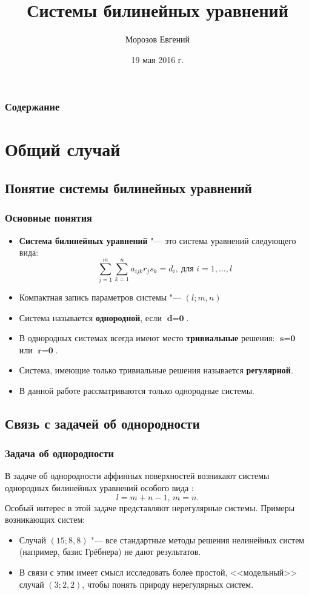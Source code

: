 \documentclass[russian,hyperref={unicode}]{beamer}
\title{Системы билинейных уравнений}
\institute
{
	Воронежский Государственный Университет \\
	Факультет Компьютерных Наук
}
\author{Морозов Евгений}
\date{19 мая 2016 г.}
\begin{document}
\frame{\titlepage}

\section[Содержание]{}
\frame
{
	\frametitle{Содержание}
	\tableofcontents
}

\section{Общий случай}
\subsection{Понятие системы билинейных уравнений}
\frame
{
  \frametitle{Основные понятия}
  
	\begin{itemize}
		\item \textbf{Система билинейных уравнений} "--- это система уравнений следующего вида:
		$$
			\sum_{j = 1}^{m} \sum_{k = 1}^{n} a_{i j k} r_j s_k = d_i,~\text{для } i = 
			1,\dots,l
		$$
		\item Компактная запись параметров системы "--- $(l; m, n)$
		\item Система называется \textbf{однородной}, если $\textbf{d} = \textbf{0}$. 
	 	\item В однородных 	системах всегда имеют место \textbf{тривиальные} решения: $\textbf{s} =  
			  \textbf{0}$ или $\textbf{r} = \textbf{0}$.
		\item Система, имеющие только тривиальные решения называется \textbf{регулярной}.
		\item В данной работе рассматриваются только однородные системы.
	\end{itemize}
}
\subsection{Связь с задачей об однородности}
\frame
{
	\frametitle{Задача об однородности}
	
	В задаче об однородности аффинных поверхностей возникают 
	системы однородных билинейных уравнений особого вида : 
	$$l = m + n - 1,\, m = n.$$ 
	Особый интерес в этой задаче представляют нерегулярные системы.
	Примеры возникающих систем:
	\begin{itemize}
		\item Случай $(15; 8, 8)$ "--- все стандартные методы решения нелинейных систем 
		(например, базис Грёбнера) не дают результатов. 
		\item В связи с этим имеет смысл исследовать более простой, <<модельный>> случай 
		$(3;2,2)$, чтобы понять природу нерегулярных систем.
	\end{itemize}
}
\end{document}
